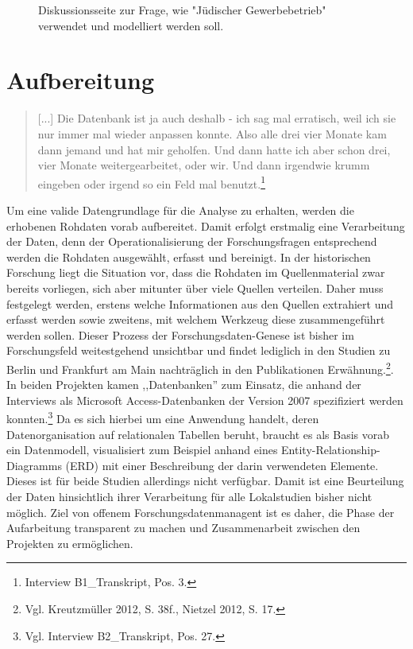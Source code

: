 \begin{figure}[h]
    \centering
    \caption{Diskussionsseite zur Frage, wie "Jüdischer Gewerbebetrieb" verwendet und modelliert werden soll.}
    \label{fig:x cubed graph}
\end{figure}

\section{Aufbereitung}

\begin{quote}
    [...] Die Datenbank ist ja auch deshalb - ich sag mal erratisch, weil ich sie nur immer mal wieder anpassen konnte. Also alle drei vier Monate kam dann jemand und hat mir geholfen. Und dann hatte ich aber schon drei, vier Monate weitergearbeitet, oder wir. Und dann irgendwie krumm eingeben oder irgend so ein Feld mal benutzt.\footnote{Interview B1\_Transkript, Pos. 3.}
\end{quote}

Um eine valide Datengrundlage für die Analyse zu erhalten, werden die erhobenen Rohdaten vorab aufbereitet. Damit erfolgt erstmalig eine Verarbeitung der Daten, denn der Operationalisierung der Forschungsfragen entsprechend werden die Rohdaten ausgewählt, erfasst und bereinigt. In der historischen Forschung liegt die Situation vor, dass die Rohdaten im Quellenmaterial zwar bereits vorliegen, sich aber mitunter über viele Quellen verteilen. Daher muss festgelegt werden, erstens welche Informationen aus den Quellen extrahiert und erfasst werden sowie zweitens, mit welchem Werkzeug diese zusammengeführt werden sollen. Dieser Prozess der Forschungsdaten-Genese ist bisher im Forschungsfeld weitestgehend unsichtbar und findet lediglich in den Studien zu Berlin und Frankfurt am Main nachträglich in den Publikationen Erwähnung.\footnote{Vgl. Kreutzmüller 2012, S. 38f., Nietzel 2012, S. 17.}. In beiden Projekten kamen ,,Datenbanken'' zum Einsatz, die anhand der Interviews als Microsoft Access-Datenbanken der Version 2007 spezifiziert werden konnten.\footnote{Vgl. Interview B2\_Transkript, Pos. 27.} Da es sich hierbei um eine Anwendung handelt, deren Datenorganisation auf relationalen Tabellen beruht, braucht es als Basis vorab ein Datenmodell, visualisiert zum Beispiel anhand eines Entity-Relationship-Diagramms (ERD) mit einer Beschreibung der darin verwendeten Elemente. Dieses ist für beide Studien allerdings nicht verfügbar. Damit ist eine Beurteilung der Daten hinsichtlich ihrer Verarbeitung für alle Lokalstudien bisher nicht möglich. Ziel von offenem Forschungsdatenmanagent ist es daher, die Phase der Aufarbeitung transparent zu machen und Zusammenarbeit zwischen den Projekten zu ermöglichen. 

